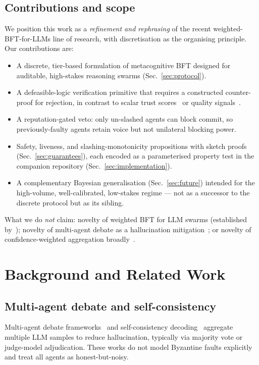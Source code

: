 \documentclass[11pt,conference]{IEEEtran}
\begin{document}
\subsection*{Contributions and scope}
We position this work as a \emph{refinement and rephrasing} of the
recent weighted-BFT-for-LLMs line of research, with discretisation as
the organising principle. Our contributions are:
\begin{itemize}
  \item A discrete, tier-based formulation of metacognitive BFT
        designed for auditable, high-stakes reasoning swarms
        (Sec.~\ref{sec:protocol}).
  \item A defeasible-logic verification primitive that requires a
        constructed counter-proof for rejection, in contrast to scalar
        trust scores~\cite{wang2025wbft} or quality
        signals~\cite{aegean2025}.
  \item A reputation-gated veto: only un-slashed agents can block
        commit, so previously-faulty agents retain voice but not
        unilateral blocking power.
  \item Safety, liveness, and slashing-monotonicity propositions with
        sketch proofs (Sec.~\ref{sec:guarantees}), each encoded as a
        parameterised property test in the companion repository
        (Sec.~\ref{sec:implementation}).
  \item A complementary Bayesian generalisation
        (Sec.~\ref{sec:future}) intended for the high-volume,
        well-calibrated, low-stakes regime --- not as a successor to
        the discrete protocol but as its sibling.
\end{itemize}
What we do \emph{not} claim: novelty of weighted BFT for LLM swarms
(established by~\cite{wang2025wbft, aegean2025}); novelty of multi-agent
debate as a hallucination mitigation~\cite{du2023debate,
liang2023encouraging}; or novelty of confidence-weighted aggregation
broadly~\cite{wang2022selfconsistency}.

\section{Background and Related Work}
\label{sec:related}

\subsection{Multi-agent debate and self-consistency}
Multi-agent debate frameworks~\cite{du2023debate, liang2023encouraging}
and self-consistency decoding~\cite{wang2022selfconsistency} aggregate
multiple LLM samples to reduce hallucination, typically via majority
vote or judge-model adjudication. These works do not model Byzantine
faults explicitly and treat all agents as honest-but-noisy.
\end{document}
